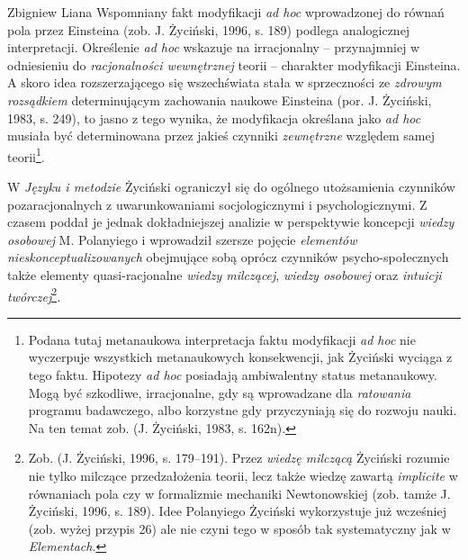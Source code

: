 \begin{artplenv}{Zbigniew Liana}
Wspomniany fakt modyfikacji \textit{ad hoc} wprowadzonej do równań pola przez Einsteina \label{ref:RNDuYYfgAN5No}(zob. J.
Życiński, 1996, s. 189) podlega analogicznej interpretacji. Określenie \textit{ad hoc} wskazuje na irracjonalny –
przynajmniej w odniesieniu do \textit{racjonalności wewnętrznej} teorii -- charakter modyfikacji Einsteina. A skoro idea
rozszerzającego się wszechświata stała w sprzeczności ze \textit{zdrowym rozsądkiem} determinującym zachowania naukowe
Einsteina \label{ref:RNDcdQNYoHSWz}(por. J. Życiński, 1983, s. 249), to jasno z tego wynika, że modyfikacja określana
jako \textit{ad hoc} musiała być determinowana przez jakieś czynniki \textit{zewnętrzne} względem samej
teorii\footnote{Podana tutaj metanaukowa interpretacja faktu modyfikacji \textit{ad hoc} nie wyczerpuje wszystkich
	metanaukowych konsekwencji, jak Życiński wyciąga z tego faktu. Hipotezy \textit{ad hoc} posiadają ambiwalentny status
	metanaukowy. Mogą być szkodliwe, irracjonalne, gdy są wprowadzane dla \textit{ratowania} programu badawczego, albo
	korzystne gdy przyczyniają się do rozwoju nauki. Na ten temat zob. \label{ref:RNDbdDBcwL7tT}(J. Życiński, 1983, s.
	162n).}.

W \textit{Języku i metodzie} Życiński ograniczył się do ogólnego utożsamienia czynników pozaracjonalnych z uwarunkowaniami
socjologicznymi i psychologicznymi. Z czasem poddał je jednak dokładniejszej analizie w perspektywie koncepcji
\textit{wiedzy osobowej} M. Polanyiego i wprowadził szersze pojęcie \textit{elementów nieskonceptualizowanych} obejmujące
sobą oprócz czynników psycho-społecznych także elementy quasi-racjonalne \textit{wiedzy milczącej}, \textit{wiedzy osobowej
}oraz \textit{intuicji twórczej}\footnote{Zob. \label{ref:RNDTM62j2cxS8}(J. Życiński, 1996, s. 179–191). Przez
	\textit{wiedzę milczącą} Życiński rozumie nie tylko milczące przedzałożenia teorii, lecz także wiedzę zawartą
	\textit{implicite} w równaniach pola czy w formalizmie mechaniki Newtonowskiej \label{ref:RNDBBgSxRheRf}(zob. tamże J.
	Życiński, 1996, s. 189). Idee Polanyiego Życiński wykorzystuje już wcześniej (zob. wyżej przypis 26) ale nie czyni tego
	w sposób tak systematyczny jak w \textit{Elementach}.}\textit{.}


\end{artplenv}
